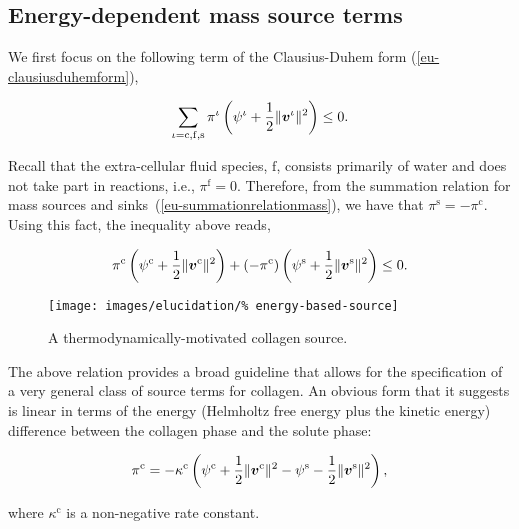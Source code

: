 \subsection{Energy-dependent mass source terms}
\label{eu-energy-dependent-source}

We first focus on the following term of the Clausius-Duhem form
(\ref{eu-clausiusduhemform}),

\begin{equation*}
\sum\limits_{\iota=\mathrm{c},\mathrm{f},\mathrm{s}} 
 \pi^{\iota} \left(\psi^{\iota}+\frac{1}{2}
\Vert\mbox{\boldmath$ v$}^\iota\Vert^2\right) \leq 0.
\end{equation*}

Recall that the extra-cellular fluid species, $\mathrm{f}$, consists
primarily of water and does not take part in reactions, i.e.,
$\pi^\mathrm{f} = 0$. Therefore, from the summation relation for mass
sources and sinks~(\ref{eu-summationrelationmass}), we have that
$\pi^\mathrm{s} = - \pi^\mathrm{c}$. Using this fact, the inequality
above reads,

\begin{equation*}
 \pi^{\mathrm{c}} \left(\psi^{\mathrm{c}}+\frac{1}{2}
 \Vert\mbox{\boldmath$ v$}^{\mathrm{c}}\Vert^2\right) + \left(-\pi^{\mathrm{c}}\right)
 \left(\psi^{\mathrm{s}}+\frac{1}{2}
 \Vert\mbox{\boldmath$ v$}^{\mathrm{s}}\Vert^2\right) \leq 0.
\end{equation*}

\begin{figure}
  \centering
  \texttt{[image: images/elucidation/\%
    energy-based-source]}
  \caption{A thermodynamically-motivated collagen source.}
  \label{energy-based-source}
\end{figure}

\noindent The above relation provides a broad guideline that allows
for the specification of a very general class of source terms for
collagen. An obvious form that it suggests is linear in terms of the
energy (Helmholtz free energy plus the kinetic energy) difference
between the collagen phase and the solute phase:

\begin{equation}
 \pi^{\mathrm{c}} = -\kappa^{\mathrm{c}}
 \left(\psi^{\mathrm{c}}+\frac{1}{2} \Vert\mbox{\boldmath$ v$}^{\mathrm{c}}\Vert^2 -
 \psi^{\mathrm{s}}-\frac{1}{2} \Vert\mbox{\boldmath$ v$}^{\mathrm{s}}\Vert^2\right),
\label{eu-energy-source-linear}
\end{equation}

\noindent where $\kappa^{\mathrm{c}}$ is a non-negative rate
constant.


